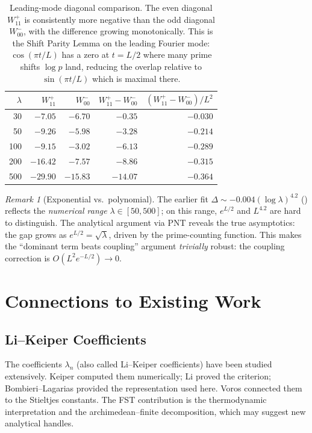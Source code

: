 \documentclass[12pt,a4paper]{article}
\theoremstyle{definition}
\theoremstyle{remark}
\newtheorem{remark}[theorem]{Remark}
\begin{document}
\begin{table}[h]
\centering
\renewcommand{\arraystretch}{1.15}
\begin{tabular}{r|r|r|r|r}
$\lambda$ & $W_{11}^+$ & $W_{00}^-$ & $W_{11}^+ - W_{00}^-$ & $(W_{11}^+ - W_{00}^-)/L^2$ \\\hline
30  & $-7.05$  & $-6.70$  & $-0.35$ & $-0.030$ \\
50  & $-9.26$  & $-5.98$  & $-3.28$ & $-0.214$ \\
100 & $-9.15$  & $-3.02$  & $-6.13$ & $-0.289$ \\
200 & $-16.42$ & $-7.57$  & $-8.86$ & $-0.315$ \\
500 & $-29.90$ & $-15.83$ & $-14.07$ & $-0.364$
\end{tabular}
\caption{Leading-mode diagonal comparison. The even diagonal $W_{11}^+$ is consistently more negative than the odd diagonal $W_{00}^-$, with the difference growing monotonically. This is the Shift Parity Lemma on the leading Fourier mode: $\cos(\pi t/L)$ has a zero at $t = L/2$ where many prime shifts $\log p$ land, reducing the overlap relative to $\sin(\pi t/L)$ which is maximal there.}
\label{tab:leading-mode}
\end{table}

\begin{remark}[Exponential vs.\ polynomial]
The earlier fit $\Delta \sim -0.004 (\log\lambda)^{4.2}$ () reflects the \emph{numerical range} $\lambda \in [50, 500]$; on this range, $e^{L/2}$ and $L^{4.2}$ are hard to distinguish. The analytical argument via PNT reveals the true asymptotics: the gap grows as $e^{L/2} = \sqrt{\lambda}$, driven by the prime-counting function. This makes the ``dominant term beats coupling'' argument \emph{trivially} robust: the coupling correction is $O(L^2 e^{-L/2}) \to 0$.
\end{remark}


\section{Connections to Existing Work}

\subsection{Li--Keiper Coefficients}
The coefficients $\lambda_n$ (also called Li--Keiper coefficients) have been studied extensively. Keiper \cite{Keiper1992} computed them numerically; Li \cite{Li1997} proved the criterion; Bombieri--Lagarias \cite{BombieriLagarias1999} provided the representation used here. Voros \cite{Voros2004} connected them to the Stieltjes constants. The FST contribution is the thermodynamic interpretation and the archimedean--finite decomposition, which may suggest new analytical handles.
\end{document}
